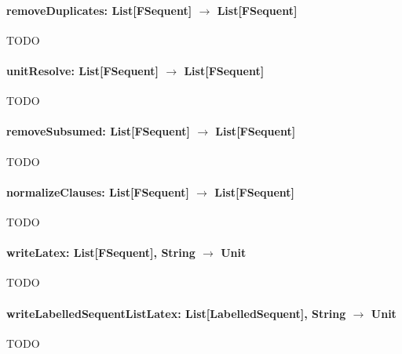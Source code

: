 \documentclass[a4paper, 11pt]{report}
\begin{document}
\paragraph{\textbf{removeDuplicates: List[FSequent] $\rightarrow$ List[FSequent]}}
{\color{red}TODO}

\paragraph{\textbf{unitResolve: List[FSequent] $\rightarrow$ List[FSequent]}}
{\color{red}TODO}

\paragraph{\textbf{removeSubsumed: List[FSequent] $\rightarrow$ List[FSequent]}}
{\color{red}TODO}

\paragraph{\textbf{normalizeClauses: List[FSequent] $\rightarrow$ List[FSequent]}}
{\color{red}TODO}

\paragraph{\textbf{writeLatex: List[FSequent], String $\rightarrow$ Unit}}
{\color{red}TODO}

\paragraph{\textbf{writeLabelledSequentListLatex: List[LabelledSequent], String $\rightarrow$ Unit}}
{\color{red}TODO}



\end{document}
